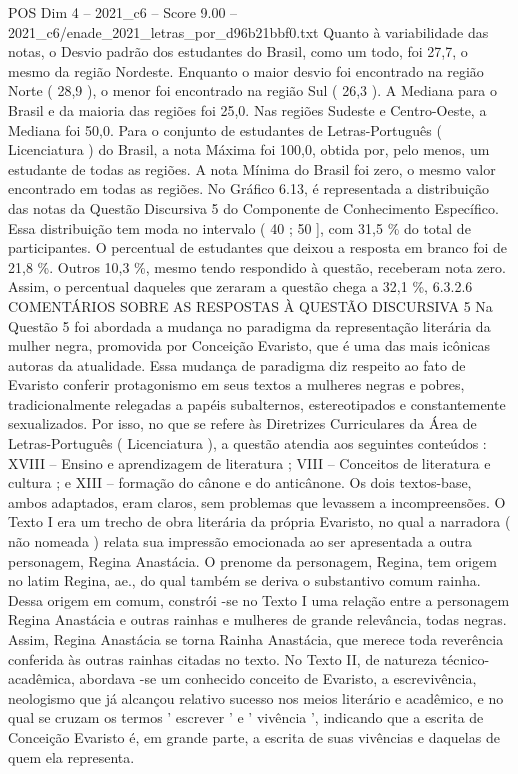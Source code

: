 \begin{textsample}{POS Dim 4 – 2021\_c6 – Score 9.00 – 2021\_c6/enade\_2021\_letras\_por\_d96b21bbf0.txt}
Quanto à variabilidade das notas, o Desvio padrão dos estudantes do Brasil, como um todo, foi 27,7, o mesmo da região Nordeste.
Enquanto o maior desvio foi encontrado na região Norte ( 28,9 ), o menor foi encontrado na região Sul ( 26,3 ).
A Mediana para o Brasil e da maioria das regiões foi 25,0.
Nas regiões Sudeste e Centro-Oeste, a Mediana foi 50,0.
Para o conjunto de estudantes de Letras-Português ( Licenciatura ) do Brasil, a nota Máxima foi 100,0, obtida por, pelo menos, um estudante de todas as regiões.
A nota Mínima do Brasil foi zero, o mesmo valor encontrado em todas as regiões.
No Gráfico 6.13, é representada a distribuição das notas da Questão Discursiva 5 do Componente de Conhecimento Específico.
Essa distribuição tem moda no intervalo ( 40 ; 50 ], com 31,5 \% do total de participantes.
O percentual de estudantes que deixou a resposta em branco foi de 21,8 \%.
Outros 10,3 \%, mesmo tendo respondido à questão, receberam nota zero.
Assim, o percentual daqueles que zeraram a questão chega a 32,1 \%, 6.3.2.6 COMENTÁRIOS SOBRE AS RESPOSTAS À QUESTÃO DISCURSIVA 5 Na Questão 5 foi abordada a mudança no paradigma da representação literária da mulher negra, promovida por Conceição Evaristo, que é uma das mais icônicas autoras da atualidade.
Essa mudança de paradigma diz respeito ao fato de Evaristo conferir protagonismo em seus textos a mulheres negras e pobres, tradicionalmente relegadas a papéis subalternos, estereotipados e constantemente sexualizados.
Por isso, no que se refere às Diretrizes Curriculares da Área de Letras-Português ( Licenciatura ), a questão atendia aos seguintes conteúdos : XVIII – Ensino e aprendizagem de literatura ; VIII – Conceitos de literatura e cultura ; e XIII – formação do cânone e do anticânone.
Os dois textos-base, ambos adaptados, eram claros, sem problemas que levassem a incompreensões.
O Texto I era um trecho de obra literária da própria Evaristo, no qual a narradora ( não nomeada ) relata sua impressão emocionada ao ser apresentada a outra personagem, Regina Anastácia.
O prenome da personagem, Regina, tem origem no latim Regina, ae., do qual também se deriva o substantivo comum rainha.
Dessa origem em comum, constrói -se no Texto I uma relação entre a personagem Regina Anastácia e outras rainhas e mulheres de grande relevância, todas negras.
Assim, Regina Anastácia se torna Rainha Anastácia, que merece toda reverência conferida às outras rainhas citadas no texto.
No Texto II, de natureza técnico-acadêmica, abordava -se um conhecido conceito de Evaristo, a escrevivência, neologismo que já alcançou relativo sucesso nos meios literário e acadêmico, e no qual se cruzam os termos ' escrever ' e ' vivência ', indicando que a escrita de Conceição Evaristo é, em grande parte, a escrita de suas vivências e daquelas de quem ela representa.

\end{textsample}
